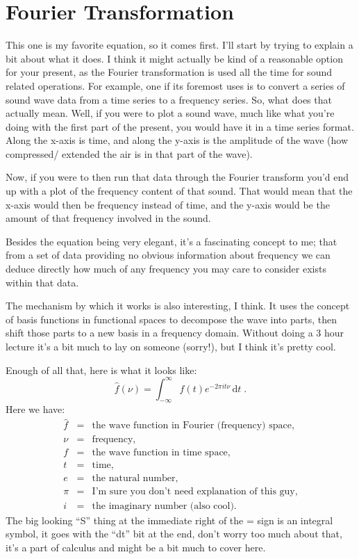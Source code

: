 \documentclass[12pt]{scrartcl}
\newcommand{\dx}[1]{\ensuremath{\,\mathrm{d}#1}}
\begin{document}
\maketitle

\section{Fourier Transformation}

This one is my favorite equation, so it comes first. I'll start by trying
to explain a bit about what it does. I think it might actually be kind
of a reasonable option for your present, as the Fourier transformation is
used all the time for sound related operations. For example, one if its
foremost uses is to convert a series of sound wave data from a time series
to a frequency series. So, what does that actually mean. Well, if you were
to plot a sound wave, much like what you're doing with the first part
of the present, you would have it in a time series format. Along the x-axis
is time, and along the y-axis is the amplitude of the wave (how compressed/
extended the air is in that part of the wave).

Now, if you were to then run that data through the Fourier transform you'd
end up with a plot of the frequency content of that sound. That would mean
that the x-axis would then be frequency instead of time, and the y-axis would
be the amount of that frequency involved in the sound.

Besides the equation being very elegant, it's a fascinating concept to me;
that from a set of data providing no obvious information about frequency we
can deduce directly how much of any frequency you may care to consider exists
within that data.

The mechanism by which it works is also interesting, I think. It uses the
concept of basis functions in functional spaces to decompose the wave
into parts, then shift those parts to a new basis in a frequency domain. Without
doing a 3 hour lecture it's a bit much to lay on someone (sorry!), but
I think it's pretty cool.

Enough of all that, here is what it looks like:
\[ \hat{f}(\nu) = \int_{-\infty}^{\infty}f(t)e^{-2\pi it\nu}\dx{t} \; . \]
Here we have:
\begin{eqnarray*}
\hat{f} & = & \textrm{the wave function in Fourier (frequency) space,} \\
\nu & = & \textrm{frequency,} \\
f & = & \textrm{the wave function in time space,} \\
t & = & \textrm{time,} \\
e & = & \textrm{the natural number,} \\
\pi & = & \textrm{I'm sure you don't need explanation of this guy,} \\
i & = & \textrm{the imaginary number (also cool).}
\end{eqnarray*}
The big looking ``S'' thing at the immediate right of the = sign is an integral
symbol, it goes with the ``dt'' bit at the end, don't worry too much
about that, it's a part of calculus and might be a bit much to cover here.
\end{document}
